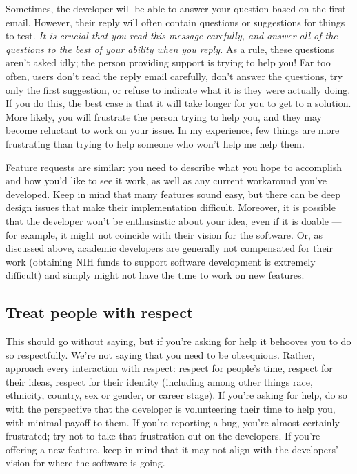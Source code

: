 \documentclass[9pt,training]{livecoms}
\begin{document}
Sometimes, the developer will be able to answer your question based on the first
email. However, their reply will often contain questions or suggestions for
things to test. \emph{It is crucial that you read this message carefully, and
answer all of the questions to the best of your ability when you reply.} As a
rule, these questions aren't asked idly; the person providing support is trying
to help you! Far too often, users don't read the reply email carefully, don't
answer the questions, try only the first suggestion, or refuse to indicate what
it is they were actually doing. If you do this, the best case is that it will
take longer for you to get to a solution. More likely, you will frustrate the
person trying to help you, and they may become reluctant to work on your issue.
In my experience, few things are more frustrating than trying to help someone
who won't help me help them.

Feature requests are similar: you need to describe what you hope to accomplish
and how you'd like to see it work, as well as any current workaround you've
developed. Keep in mind that many features sound easy, but there can be deep
design issues that make their implementation difficult. Moreover, it is possible
that the developer won't be enthusiastic about your idea, even if it is doable
--- for example, it might not coincide with their vision for the software. Or,
as discussed above, academic developers are generally not compensated for their
work (obtaining NIH funds to support software development is extremely
difficult) and simply might not have the time to work on new features.

\subsection{Treat people with respect}

This should go without saying, but if you're asking for help it behooves you to
do so respectfully. We're not saying that you need to be obsequious. Rather,
approach every interaction with respect: respect for people's time, respect for
their ideas, respect for their identity (including among other things race,
ethnicity, country, sex or gender, or career stage). If you're asking for help,
do so with the perspective that the developer is volunteering their time to help
you, with minimal payoff to them.  If you're reporting a bug, you're almost
certainly frustrated; try not to take that frustration out on the developers. If
you're offering a new feature, keep in mind that it may not align with the
developers' vision for where the software is going.
\end{document}
